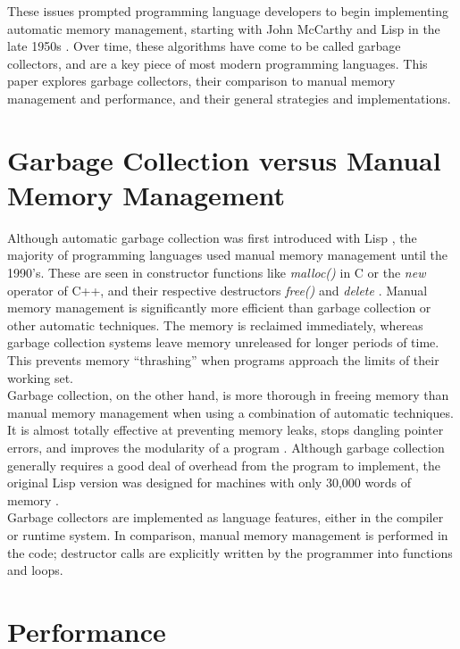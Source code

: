 \documentclass[12pt]{article}
\begin{document}
These issues prompted programming language developers to begin implementing automatic memory management, starting with John McCarthy and Lisp in the late 1950s \cite{https://www.seas.harvard.edu/courses/cs252/2016fa/16.pdf}. Over time, these algorithms have come to be called garbage collectors, and are a key piece of most modern programming languages. This paper explores garbage collectors, their comparison to manual memory management and performance, and their general strategies and implementations. 

\section{Garbage Collection versus Manual Memory Management}
Although automatic garbage collection was first introduced with Lisp \cite{chis11}, the majority of programming languages used manual memory management until the 1990's. These are seen in constructor functions like \textit{malloc()} in C or the \textit{new} operator of C++, and their respective destructors \textit{free()} and \textit{delete} \cite{pythDocs}. Manual memory management is significantly more efficient than garbage collection or other automatic techniques. The memory is reclaimed immediately, whereas garbage collection systems leave memory unreleased for longer periods of time. This prevents memory ``thrashing'' when programs approach the limits of their working set.\\

Garbage collection, on the other hand, is more thorough in freeing memory than manual memory management when using a combination of automatic techniques. It is almost totally effective at preventing memory leaks, stops dangling pointer errors, and improves the modularity of a program \cite{hertz05}. Although garbage collection generally requires a good deal of overhead from the program to implement, the original Lisp version was designed for machines with only 30,000 words of memory \cite{chis11}.\\

Garbage collectors are implemented as language features, either in the compiler or runtime system. In comparison, manual memory management is performed in the code; destructor calls are explicitly written by the programmer into functions and loops.

\section{Performance}
\end{document}
